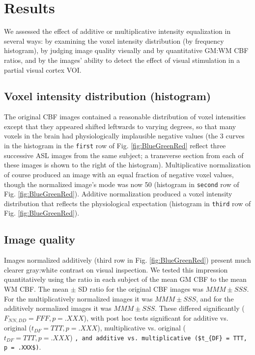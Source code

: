 \section{Results}
We assessed the effect of additive or multiplicative intensity equalization in several ways: by examining the voxel intensity distribution (by frequency histogram), by judging image quality visually and by quantitative GM:WM CBF ratios, and by the images' ability to detect the effect of visual stimulation in a partial visual cortex VOI. 

\subsection{Voxel intensity distribution (histogram)}
The original CBF images contained a reasonable distribution of voxel intensities except that they appeared shifted leftwards to varying degrees, so that many voxels in the brain had physiologically implausible negative values (the 3 curves in the histogram in the \verb|first| row of Fig. \ref{fig:BlueGreenRed} reflect three successive ASL images from the same subject; a transverse section from each of these images is shown to the right of the histogram). Multiplicative normalization of course produced an image with an equal fraction of negative voxel values, though the normalized image's mode was now 50 (histogram in \verb|second| row of Fig. \ref{fig:BlueGreenRed}). Additive normalization produced a voxel intensity distribution that reflects the physiological expectation (histogram in \verb|third| row of Fig. \ref{fig:BlueGreenRed}). 

\subsection{Image quality}
Images normalized additively (third row in Fig. \ref{fig:BlueGreenRed}) present much clearer gray:white contrast on visual inspection. We tested this impression quantitatively using the ratio in each subject of the mean GM CBF to the mean WM CBF. The mean $\pm$ SD ratio for the original CBF images was $MMM \pm SSS$. For the multiplicatively normalized images it was $MMM \pm SSS$, and for the additively normalized images it was $MMM \pm SSS$. These differed significantly ($F_{NN,DD} = FFF, p = .XXX$), with post hoc tests significant for additive vs. original ($t_{DF} = TTT, p = .XXX$), multiplicative vs. original ($t_{DF} = TTT, p = .XXX$) \verb|, and additive vs. multiplicative ($t_{DF} = TTT, p = .XXX$)|.

